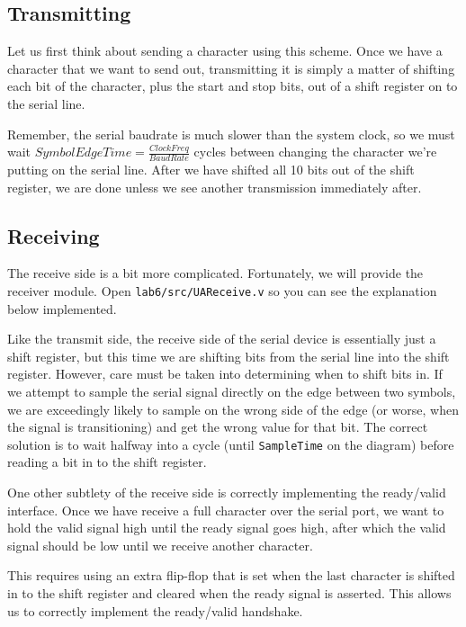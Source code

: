 \documentclass[11pt]{article}
\begin{document}
\subsection{Transmitting}
Let us first think about sending a character using this scheme. Once we have a character that we want to send out, transmitting it is simply a matter of shifting each bit of the character, plus the start and stop bits, out of a shift register on to the serial line. 

Remember, the serial baudrate is much slower than the system clock, so we must wait $SymbolEdgeTime = \frac{ClockFreq}{BaudRate}$ cycles between changing the character we're putting on the serial line. After we have shifted all 10 bits out of the shift register, we are done unless we see another transmission immediately after.

\subsection{Receiving}
The receive side is a bit more complicated. Fortunately, we will provide the receiver module. Open \verb|lab6/src/UAReceive.v| so you can see the explanation below implemented. 

Like the transmit side, the receive side of the serial device is essentially just a shift register, but this time we are shifting bits from the serial line into the shift register. However, care must be taken into determining when to shift bits in. If we attempt to sample the serial signal directly on the edge between two symbols, we are exceedingly likely to sample on the wrong side of the edge (or worse, when the signal is transitioning) and get the wrong value for that bit. The correct solution is to wait halfway into a cycle (until \verb|SampleTime| on the diagram) before reading a bit in to the shift register.

One other subtlety of the receive side is correctly implementing the ready/valid interface. Once we have receive a full character over the serial port, we want to hold the valid signal high until the ready signal goes high, after which the valid signal should be low until we receive another character. 

This requires using an extra flip-flop that is set when the last character is shifted in to the shift register and cleared when the ready signal is asserted. This allows us to correctly implement the ready/valid handshake.
\end{document}
